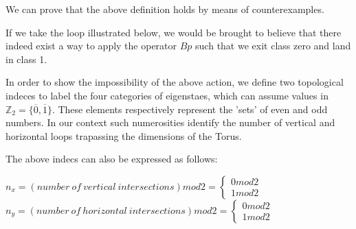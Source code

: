 \documentclass[12pt]{report}
\begin{document}
\begin{minipage}{1\textwidth}
	We can prove that the above definition holds by means of counterexamples.\newline
	
	If we take the loop illustrated below, we would be brought to believe that there indeed exist a way to apply the operator $Bp$ such that we exit class zero and land in class 1. \newline
	
	
	In order to show the impossibility of the above action, we define two topological indeces to label the four categories of eigenstaes, which can assume values in $\mathbb{Z}_2=\{\overline{0},\overline{1} \}$. These elements respectively represent the 'sets' of even and odd numbers. In our context such numerosities identify the number of vertical and horizontal loops trapassing the dimensions of the Torus. \newline
	
	The above indecs can also be expressed as follows: 
	
	\begin{center}
		$n_x= (number \ of \ vertical \ intersections)mod2 = 
		\begin{cases} 
			0mod2 \\
			1mod2  
		\end{cases}$ 
		$n_y= (number \ of \ horizontal \ intersections)mod2 =\begin{cases} 
			0mod2 \\
			1mod2  
		\end{cases}$ 
	\end{center}
	
	
	
\end{minipage}
\end{document}

